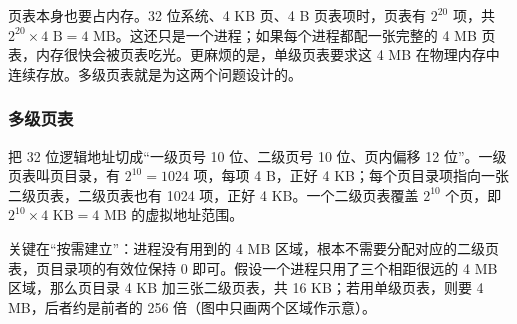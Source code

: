 页表本身也要占内存。32 位系统、4 KB 页、4 B 页表项时，页表有 $2^{20}$ 项，共 $2^{20}\times 4\text{ B}=4\text{ MB}$。这还只是一个进程；如果每个进程都配一张完整的 4 MB 页表，内存很快会被页表吃光。更麻烦的是，单级页表要求这 4 MB 在物理内存中连续存放。多级页表就是为这两个问题设计的。

\subsubsection{多级页表}

把 32 位逻辑地址切成“一级页号 10 位、二级页号 10 位、页内偏移 12 位”。一级页表叫页目录，有 $2^{10}=1024$ 项，每项 4 B，正好 4 KB；每个页目录项指向一张二级页表，二级页表也有 1024 项，正好 4 KB。一个二级页表覆盖 $2^{10}$ 个页，即 $2^{10}\times 4\text{ KB}=4\text{ MB}$ 的虚拟地址范围。

关键在“按需建立”：进程没有用到的 4 MB 区域，根本不需要分配对应的二级页表，页目录项的有效位保持 0 即可。假设一个进程只用了三个相距很远的 4 MB 区域，那么页目录 4 KB 加三张二级页表，共 16 KB；若用单级页表，则要 4 MB，后者约是前者的 256 倍（图中只画两个区域作示意）。

